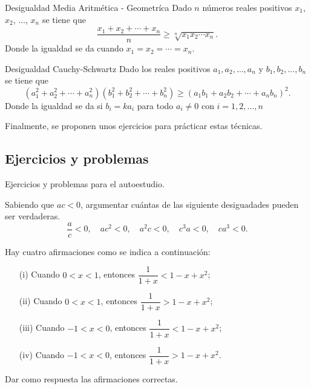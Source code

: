 \begin{box.theorem}{Desigualdad Media Aritmética - Geometríca}{}
    Dado $n$ números reales positivos $x_1$, $x_2$, $\ldots$, $x_n$ se tiene que
    \[
        \dfrac{x_1 + x_2 + \cdots + x_n}{n} \geq \sqrt[n]{x_1 x_2 \cdots x_n}.
    \]
    Donde la igualdad se da cuando $x_1 = x_2 = \cdots = x_n$.
\end{box.theorem}

\begin{box.theorem}{Desigualdad Cauchy-Schwartz}{}
    Dado los reales positivos $a_1, a_2, \ldots, a_n$ y $b_1, b_2, \ldots, b_n$ se tiene que
    \[
        (a_1^2 + a_2^2 + \cdots + a_n^2)(b_1^2 + b_2^2 + \cdots + b_n^2) \geq (a_1 b_1 + a_2 b_2 + \cdots + a_n b_n)^2.
    \]
    Donde la igualdad se da si $b_i = k a_i$ para todo $a_i \neq 0$ con $i = 1, 2, \ldots, n$
\end{box.theorem}

Finalmente, se proponen unos ejercicios para prácticar estas técnicas.



\subsection{Ejercicios y problemas}

Ejercicios y problemas para el autoestudio.

\begin{exercise}
    Sabiendo que $ac < 0$, argumentar cuántas de las siguiente desiguadades pueden ser verdaderas.
    \[
        \frac{a}{c} < 0,\quad ac^2 < 0,\quad a^2 c < 0,\quad c^3 a < 0,\quad ca^3 < 0.
    \]
\end{exercise}

\begin{exercise}
    Hay cuatro afirmaciones como se indica a continuación:
    \begin{itemize}
        \item[(i)] Cuando $0 < x < 1$, entonces $\dfrac{1}{1 + x} < 1 - x + x^2$;
        \item[(ii)] Cuando $0 < x < 1$, entonces $\dfrac{1}{1 + x} > 1 - x + x^2$;
        \item[(iii)] Cuando $-1 < x < 0$, entonces $\dfrac{1}{1 + x} < 1 - x + x^2$;
        \item[(iv)] Cuando $-1 < x < 0$, entonces $\dfrac{1}{1 + x} > 1 - x + x^2$.
    \end{itemize}
    Dar como respuesta las afirmaciones correctas.
\end{exercise}

